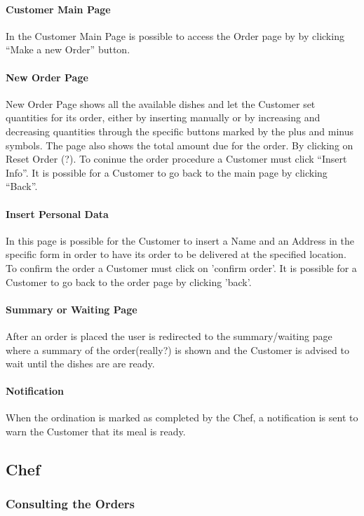 \paragraph{Customer Main Page}
In the Customer Main Page is possible to access the Order page by by clicking ``Make a new Order'' button.

\paragraph{New Order Page}
New Order Page shows all the available dishes and let the Customer set quantities for its order, either by inserting manually or by increasing and decreasing quantities through the specific buttons marked by the plus and minus symbols. The page also shows the total amount due for the order.
By clicking on Reset Order (?).
To coninue the order procedure a Customer must click ``Insert Info''. 
It is possible for a Customer to go back to the main page by clicking ``Back''.

\paragraph{Insert Personal Data}
In this page is possible for the Customer to insert a Name and an Address in the specific form in order to have its order to be delivered at the specified location. To confirm the order a Customer must click on 'confirm order'. 
It is possible for a Customer to go back to the order page by clicking 'back'.

\paragraph{Summary or Waiting Page}
After an order is placed the user is redirected to the summary/waiting page where a summary of the order(really?) is shown and the Customer is advised to wait until the dishes are are ready.

\paragraph{Notification}
When the ordination is marked as completed by the Chef, a notification is sent to warn the Customer that its meal is ready.

\subsection{Chef}
\subsubsection{Consulting the Orders}

